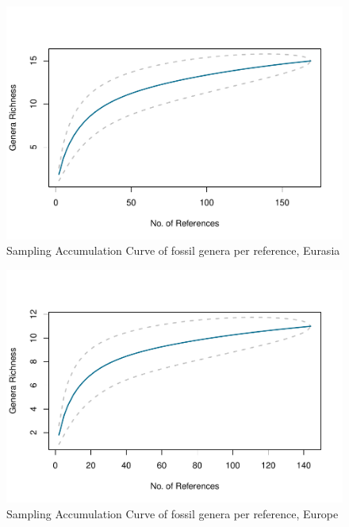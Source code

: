 \documentclass[]{article}
\begin{document}
\begin{figure}[htbp]
\centering
\includegraphics{MA_JJ_files/figure-latex/SACGEurasia-1.pdf}
\caption{Sampling Accumulation Curve of fossil genera per reference,
Eurasia}
\end{figure}

\begin{figure}[htbp]
\centering
\includegraphics{MA_JJ_files/figure-latex/SACGEurope-1.pdf}
\caption{Sampling Accumulation Curve of fossil genera per reference,
Europe}
\end{figure}
\end{document}

